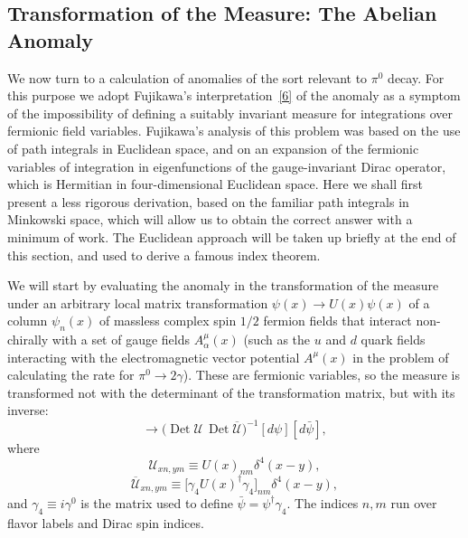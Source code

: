 \subsection{Transformation of the Measure: The Abelian Anomaly}
\label{sec:22.2}

We now turn to a calculation of anomalies of the sort relevant to $\pi^0$
decay. For this purpose we adopt Fujikawa's
interpretation~\hyperref[ch22-ref-6]{[6]} of the anomaly as a symptom of
the impossibility of defining a suitably invariant measure for integrations
over fermionic field variables. Fujikawa's analysis of this problem was
based on the use of path integrals in Euclidean space, and on an expansion
of the fermionic variables of integration in eigenfunctions of the
gauge-invariant Dirac operator, which is Hermitian in four-dimensional
Euclidean space. Here we shall first present a less rigorous derivation,
based on the familiar path integrals in Minkowski space, which will allow
us to obtain the correct answer with a minimum of work. The Euclidean
approach will be taken up briefly at the end of this section, and used to
derive a famous index theorem.

We will start by evaluating the anomaly in the transformation of the
measure under an arbitrary local matrix transformation
$\psi(x)\to U(x)\psi(x)$ of a column $\psi_n(x)$ of massless complex spin
$1/2$ fermion fields that interact non-chirally with a set of gauge fields
$A_\alpha^\mu(x)$ (such as the $u$ and $d$ quark fields interacting with
the electromagnetic vector potential $A^\mu(x)$ in the problem of
calculating the rate for $\pi^0\to2\gamma$). These are fermionic variables,
so the measure is transformed not with the determinant of the
transformation matrix, but with its inverse:
\begin{equation}
 [d\psi][d\bar\psi]\longrightarrow
 \bigl(\operatorname{Det}\mathcal U\,
       \operatorname{Det}\overline{\mathcal U}\bigr)^{-1}
 [d\psi][d\bar\psi],
 \tag{22.2.1}\label{eq:22.2.1}
\end{equation}
where
\begin{equation}
 \mathcal U_{xn,ym}\equiv U(x)_{nm}\delta^4(x-y),
 \tag{22.2.2}\label{eq:22.2.2}
\end{equation}
\begin{equation}
 \overline{\mathcal U}_{xn,ym}
 \equiv\bigl[\gamma_4U(x)^\dagger\gamma_4\bigr]_{nm}\delta^4(x-y),
 \tag{22.2.3}\label{eq:22.2.3}
\end{equation}
and $\gamma_4\equiv i\gamma^0$ is the matrix used to define
$\bar\psi=\psi^\dagger\gamma_4$. The indices $n,m$ run over flavor labels
and Dirac spin indices.

